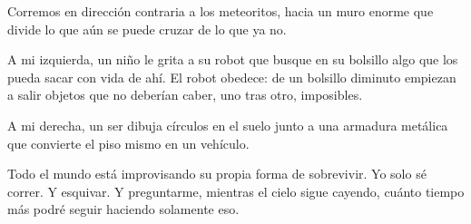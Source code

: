 Corremos en dirección contraria a los meteoritos, hacia un muro enorme que divide lo que aún se puede cruzar de lo que ya no.

A mi izquierda, un niño le grita a su robot que busque en su bolsillo algo que los pueda sacar con vida de ahí. El robot obedece: de un bolsillo diminuto empiezan a salir objetos que no deberían caber, uno tras otro, imposibles.

A mi derecha, un ser dibuja círculos en el suelo junto a una armadura metálica que convierte el piso mismo en un vehículo.

Todo el mundo está improvisando su propia forma de sobrevivir. Yo solo sé correr. Y esquivar. Y preguntarme, mientras el cielo sigue cayendo, cuánto tiempo más podré seguir haciendo solamente eso.
